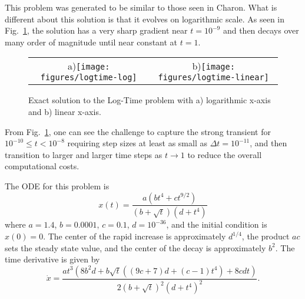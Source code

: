 This problem was generated to be similar to those seen in Charon.
What is different about this solution is that it evolves on logarithmic
scale. As seen in Fig.~\ref{rythmos:fig:LogTime-exact}, the solution
has a very sharp gradient near $t=10^{-9}$ and then decays over many
order of magnitude until near constant at $t=1$.
\begin{figure}
\centering{}%
\begin{tabular}{cc}
a)\texttt{[image: figures/logtime-log]} & b)\texttt{[image: figures/logtime-linear]}\tabularnewline
\end{tabular}\caption{Exact solution to the Log-Time problem with a) logarithmic x-axis
and b) linear x-axis.\label{rythmos:fig:LogTime-exact}}
\end{figure}
From Fig.~\ref{rythmos:fig:LogTime-exact}, one can see the challenge
to capture the strong transient for $10^{-10}\leq t<10^{-8}$ requiring
step sizes at least as small as $\Delta t=10^{-11}$, and then transition
to larger and larger time steps as $t\rightarrow1$ to reduce the
overall computational costs.

The ODE for this problem is
\[
x(t)=\frac{a\left(bt^{4}+ct^{9/2}\right)}{\left(b+\sqrt{t}\right)\left(d+t^{4}\right)}
\]
where $a=1.4$, $b=0.0001$, $c=0.1$, $d=10^{-36}$, and the initial
condition is $x(0)=0.$ The center of the rapid increase is approximately
$d^{1/4}$, the product $ac$ sets the steady state value, and the
center of the decay is approximately $b^{2}$. The time derivative
is given by
\[
\dot{x}=\frac{at^{3}\left(8b^{2}d+b\sqrt{t}\left((9c+7)d+(c-1)t^{4}\right)+8cdt\right)}{2\left(b+\sqrt{t}\right)^{2}\left(d+t^{4}\right)^{2}}.
\]

